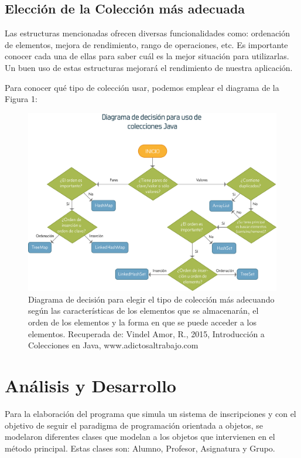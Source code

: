 \documentclass[12pt, letterpaper]{report}
\begin{document}
    \subsection*{Elección de la Colección más adecuada}

Las estructuras mencionadas ofrecen diversas funcionalidades como: ordenación de elementos, mejora de rendimiento, rango de operaciones, etc. Es importante conocer cada una de ellas para saber cuál es la mejor situación para utilizarlas. Un buen uso de estas estructuras mejorará el rendimiento de nuestra aplicación.

Para conocer qué tipo de colección usar, podemos emplear el diagrama de la Figura 1:\\

\begin{figure}[h]
  \includegraphics{Diagrama_desicion.png}
  \caption{Diagrama de decisión para elegir el tipo de colección más adecuando según las características de los elementos que se almacenarán, el orden de los elementos y la forma en que se puede acceder a los elementos. Recuperada de: Vindel Amor, R., 2015, Introducción a Colecciones en Java, www.adictosaltrabajo.com }
\end{figure}



\section*{Análisis y Desarrollo}
Para la elaboración del programa que simula un sistema de inscripciones y con el objetivo de seguir el paradigma de programación orientada a objetos, se modelaron diferentes clases que modelan a los objetos que intervienen en el método principal. Estas clases son: Alumno, Profesor, Asignatura y Grupo. 
\end{document}
